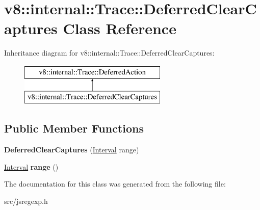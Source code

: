 \hypertarget{classv8_1_1internal_1_1_trace_1_1_deferred_clear_captures}{}\section{v8\+:\+:internal\+:\+:Trace\+:\+:Deferred\+Clear\+Captures Class Reference}
\label{classv8_1_1internal_1_1_trace_1_1_deferred_clear_captures}
Inheritance diagram for v8\+:\+:internal\+:\+:Trace\+:\+:Deferred\+Clear\+Captures\+:\begin{figure}[H]
\begin{center}
\leavevmode
\includegraphics[height=2.000000cm]{classv8_1_1internal_1_1_trace_1_1_deferred_clear_captures}
\end{center}
\end{figure}
\subsection*{Public Member Functions}
\begin{DoxyCompactItemize}
\item 
\hypertarget{classv8_1_1internal_1_1_trace_1_1_deferred_clear_captures_a1449af3c613a25426e4dd99d5ee496d4}{}{\bfseries Deferred\+Clear\+Captures} (\hyperlink{classv8_1_1internal_1_1_interval}{Interval} range)\label{classv8_1_1internal_1_1_trace_1_1_deferred_clear_captures_a1449af3c613a25426e4dd99d5ee496d4}

\item 
\hypertarget{classv8_1_1internal_1_1_trace_1_1_deferred_clear_captures_a195b6197459bcdc53ecc6b8f3818bbd4}{}\hyperlink{classv8_1_1internal_1_1_interval}{Interval} {\bfseries range} ()\label{classv8_1_1internal_1_1_trace_1_1_deferred_clear_captures_a195b6197459bcdc53ecc6b8f3818bbd4}

\end{DoxyCompactItemize}


The documentation for this class was generated from the following file\+:\begin{DoxyCompactItemize}
\item 
src/jsregexp.\+h\end{DoxyCompactItemize}
